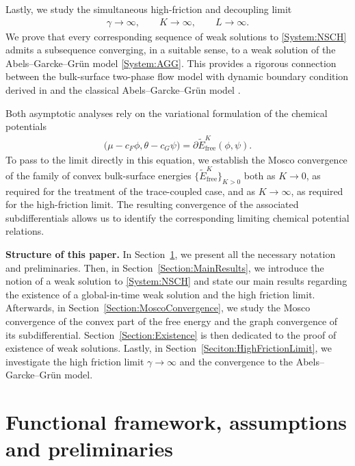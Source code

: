 \documentclass[11pt,reqno]{amsart}
\theoremstyle{remark}
\numberwithin{equation}{section}
\newcommand{\free}{\mathrm{free}}
\begin{document}
Lastly, we study the simultaneous high-friction and decoupling limit
\begin{align*}
    \gamma\rightarrow\infty, \qquad K\rightarrow\infty, \qquad L\rightarrow\infty.
\end{align*}
We prove that every corresponding sequence of weak solutions to \eqref{System:NSCH} admits a subsequence converging, in a suitable sense, to a weak solution of the Abels--Garcke--Grün model \eqref{System:AGG}. This provides a rigorous connection between the bulk-surface two-phase flow model with dynamic boundary condition derived in \cite{Knopf2025a} and the classical Abels--Garcke--Grün model \cite{Abels2012}.

Both asymptotic analyses rely on the variational formulation of the chemical potentials
\begin{align*}
    \big(\mu - c_F\phi,\theta - c_G\psi\big) = \partial\widetilde E_\free^K(\phi,\psi).
\end{align*}
To pass to the limit directly in this equation, we establish the Mosco convergence of the family of convex bulk-surface energies $\{\widetilde E_\free^K\}_{K>0}$ both as $K\rightarrow 0$, as required for the treatment of the trace-coupled case, and as $K\rightarrow\infty$, as required for the high-friction limit. The resulting convergence of the associated subdifferentials allows us to identify the corresponding limiting chemical potential relations. 

\textbf{Structure of this paper.}
In Section~\ref{Section:Prelim}, we present all the necessary notation and preliminaries. Then, in Section~\ref{Section:MainResults}, we introduce the notion of a weak solution to \eqref{System:NSCH} and state our main results regarding the existence of a global-in-time weak solution and the high friction limit. Afterwards, in Section~\ref{Section:MoscoConvergence}, we study the Mosco convergence of the convex part of the free energy and the graph convergence of its subdifferential. Section~\ref{Section:Existence} is then dedicated to the proof of existence of weak solutions. Lastly, in Section~\ref{Seciton:HighFrictionLimit}, we investigate the high friction limit $\gamma\rightarrow\infty$ and the convergence to the Abels--Garcke--Grün model.

\noindent
\section{Functional framework, assumptions and preliminaries}
\label{Section:Prelim}
\end{document}
